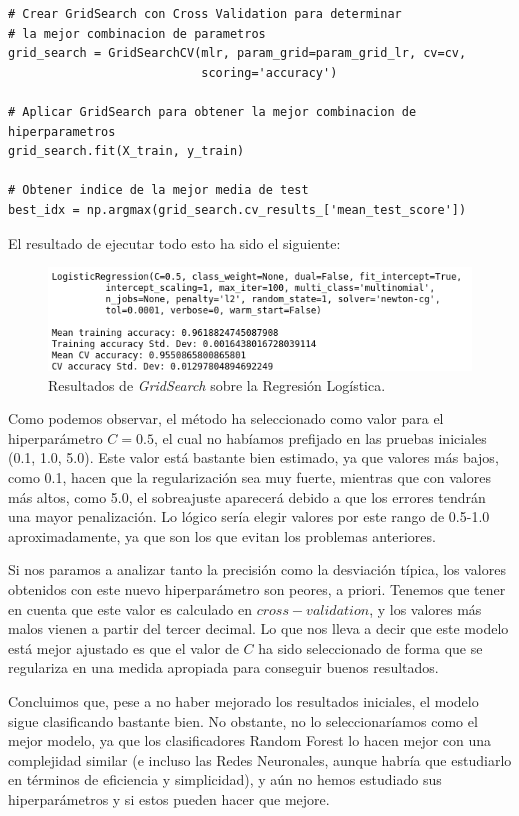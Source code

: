 \documentclass[11pt,a4paper]{article}
\begin{document}
\begin{lstlisting}
# Crear GridSearch con Cross Validation para determinar
# la mejor combinacion de parametros
grid_search = GridSearchCV(mlr, param_grid=param_grid_lr, cv=cv,
                           scoring='accuracy')

# Aplicar GridSearch para obtener la mejor combinacion de hiperparametros
grid_search.fit(X_train, y_train)

# Obtener indice de la mejor media de test
best_idx = np.argmax(grid_search.cv_results_['mean_test_score'])

\end{lstlisting}

El resultado de ejecutar todo esto ha sido el siguiente:

\begin{figure}[H]
    \centering
    \includegraphics[scale=0.6]{img/gs-lr.png}
    \caption{Resultados de \textit{GridSearch} sobre la Regresión Logística.}
    \label{fig:gs-lr}
\end{figure}

Como podemos observar, el método ha seleccionado como valor para el hiperparámetro $C = 0.5$, el cual no habíamos prefijado en las pruebas
iniciales (0.1, 1.0, 5.0). Este valor está bastante bien estimado, ya que valores más bajos, como 0.1, hacen que la regularización sea muy
fuerte, mientras que con valores más altos, como 5.0, el sobreajuste aparecerá debido a que los errores tendrán una mayor penalización. Lo
lógico sería elegir valores por este rango de 0.5-1.0 aproximadamente, ya que son los que evitan los problemas anteriores.

Si nos paramos a analizar tanto la precisión como la desviación típica, los valores obtenidos con este nuevo hiperparámetro son peores, a
priori. Tenemos que tener en cuenta que este valor es calculado en $cross-validation$, y los valores más malos vienen a partir del tercer
decimal. Lo que nos lleva a decir que este modelo está mejor ajustado es que el valor de $C$ ha sido seleccionado de forma que se
regulariza en una medida apropiada para conseguir buenos resultados.

Concluimos que, pese a no haber mejorado los resultados iniciales, el modelo sigue clasificando bastante bien. No obstante, no lo
seleccionaríamos como el mejor modelo, ya que los clasificadores Random Forest lo hacen mejor con una complejidad similar (e incluso las
Redes Neuronales, aunque habría que estudiarlo en términos de eficiencia y simplicidad), y aún no hemos estudiado sus hiperparámetros y si
estos pueden hacer que mejore.
\end{document}

